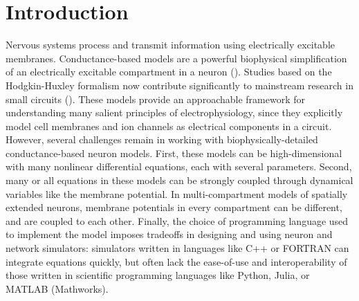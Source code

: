 \documentclass{frontiersSCNS} %
\begin{document}
\section{Introduction}
\label{sec:intro}

Nervous systems process and transmit information using electrically excitable membranes. Conductance-based models are a powerful biophysical simplification of an electrically excitable compartment in a neuron (\cite{hodgkinQuantitativeDescriptionMembrane1952}). Studies based on the Hodgkin-Huxley formalism now contribute significantly to mainstream research in small circuits (\cite{marderTheoryMotion1995, prinzComputationalApproachesNeuronal2010, prinzInsightsModelsRhythmic2006}). These models provide an approachable framework for understanding many salient principles of electrophysiology, since they explicitly model cell membranes and ion channels as electrical components in a circuit. However, several challenges remain in working with biophysically-detailed conductance-based neuron models. First, these models can be high-dimensional with many nonlinear differential equations, each with several parameters. Second, many or all equations in these models can be strongly coupled through dynamical variables like the membrane potential.  In multi-compartment models of spatially extended neurons, membrane potentials in every compartment can be different, and are coupled to each other. Finally, the choice of programming language used to implement the model imposes tradeoffs in designing and using neuron and network simulators: simulators written in languages like C++ or FORTRAN can integrate equations quickly, but often lack the ease-of-use and interoperability of those written in scientific programming languages like Python, Julia, or MATLAB (Mathworks).
\end{document}
